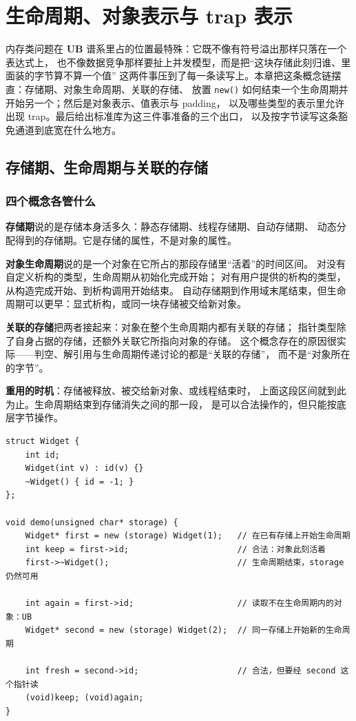 \documentclass[12pt,a4paper,fontset=fandol]{ctexbook}
\newcommand{\Fn}[1]{\texttt{#1()}}
\newcommand{\UB}{\textbf{\textsf{UB}}}
\begin{document}
\chapter{生命周期、对象表示与 trap 表示}\label{ch:ub04-lifetime}

内存类问题在 \UB{} 谱系里占的位置最特殊：它既不像有符号溢出那样只落在一个表达式上，
也不像数据竞争那样要扯上并发模型，而是把“这块存储此刻归谁、里面装的字节算不算一个值”
这两件事压到了每一条读写上。本章把这条概念链摆直：存储期、对象生命周期、关联的存储、
放置 \Fn{new} 如何结束一个生命周期并开始另一个；然后是对象表示、值表示与 padding，
以及哪些类型的表示里允许出现 trap。最后给出标准库为这三件事准备的三个出口，
以及按字节读写这条豁免通道到底宽在什么地方。

\section{存储期、生命周期与关联的存储}\label{sec:ub04-concepts}

\subsection{四个概念各管什么}\label{sec:ub04-four-concepts}

\textbf{存储期}说的是存储本身活多久：静态存储期、线程存储期、自动存储期、
动态分配得到的存储期。它是存储的属性，不是对象的属性。

\textbf{对象生命周期}说的是一个对象在它所占的那段存储里“活着”的时间区间。
对没有自定义析构的类型，生命周期从初始化完成开始；
对有用户提供的析构的类型，从构造完成开始、到析构调用开始结束。
自动存储期到作用域末尾结束，但生命周期可以更早：显式析构，或同一块存储被交给新对象。

\textbf{关联的存储}把两者接起来：对象在整个生命周期内都有关联的存储；
指针类型除了自身占据的存储，还额外关联它所指向对象的存储。
这个概念存在的原因很实际——判空、解引用与生命周期传递讨论的都是“关联的存储”，
而不是“对象所在的字节”。

\textbf{重用的时机}：存储被释放、被交给新对象、或线程结束时，
上面这段区间就到此为止。生命周期结束到存储消失之间的那一段，
是可以合法操作的，但只能按底层字节操作。

\begin{lstlisting}[style=cppstyle, caption={生命周期结束、存储仍在：三种写法三种命运}]
struct Widget {
    int id;
    Widget(int v) : id(v) {}
    ~Widget() { id = -1; }
};

void demo(unsigned char* storage) {
    Widget* first = new (storage) Widget(1);   // 在已有存储上开始生命周期
    int keep = first->id;                      // 合法：对象此刻活着
    first->~Widget();                          // 生命周期结束，storage 仍然可用

    int again = first->id;                     // 读取不在生命周期内的对象：UB
    Widget* second = new (storage) Widget(2);  // 同一存储上开始新的生命周期

    int fresh = second->id;                    // 合法，但要经 second 这个指针读
    (void)keep; (void)again;
}
\end{lstlisting}
\end{document}
